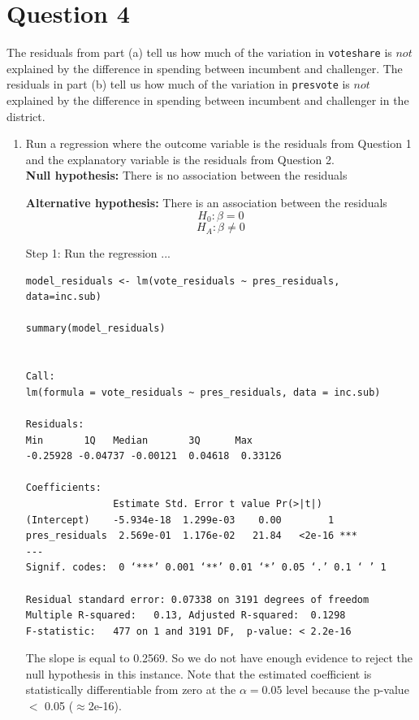 \documentclass[12pt,letterpaper]{article}
\begin{document}
\section*{Question 4}
\noindent The residuals from part (a) tell us how much of the variation in \texttt{voteshare} is $not$ explained by the difference in spending between incumbent and challenger. The residuals in part (b) tell us how much of the variation in \texttt{presvote} is $not$ explained by the difference in spending between incumbent and challenger in the district.
	\begin{enumerate}
		\item Run a regression where the outcome variable is the residuals from Question 1 and the explanatory variable is the residuals from Question 2.	\\
		
\textbf{		Null hypothesis: }
		There is no association between the residuals
		
\textbf{		Alternative hypothesis: }
		There is an association between the residuals \\

	$$H_0: \beta = 0$$
$$H_A: \beta \neq 0$$

\vspace{.25cm}


Step 1: Run the regression ...

			\begin{verbatim}
model_residuals <- lm(vote_residuals ~ pres_residuals, data=inc.sub)

summary(model_residuals)


Call:
lm(formula = vote_residuals ~ pres_residuals, data = inc.sub)

Residuals:
Min       1Q   Median       3Q      Max 
-0.25928 -0.04737 -0.00121  0.04618  0.33126 

Coefficients:
               Estimate Std. Error t value Pr(>|t|)    
(Intercept)    -5.934e-18  1.299e-03    0.00        1    
pres_residuals  2.569e-01  1.176e-02   21.84   <2e-16 ***
---
Signif. codes:  0 ‘***’ 0.001 ‘**’ 0.01 ‘*’ 0.05 ‘.’ 0.1 ‘ ’ 1

Residual standard error: 0.07338 on 3191 degrees of freedom
Multiple R-squared:   0.13,	Adjusted R-squared:  0.1298 
F-statistic:   477 on 1 and 3191 DF,  p-value: < 2.2e-16

		\end{verbatim}
		
The slope is equal to 0.2569. So we do not have enough evidence to reject the null hypothesis in this instance. Note that the estimated coefficient is statistically differentiable from zero at the $\alpha=0.05$ level because the p-value  $<$ 0.05 ($\approx $2e-16).
	

\end{enumerate}
\end{document}
